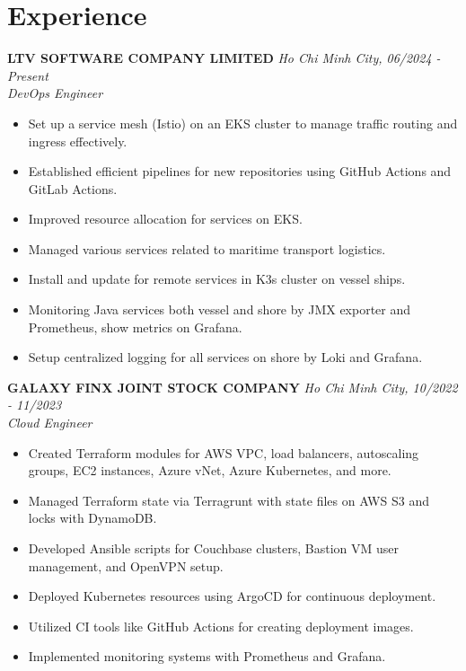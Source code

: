 \documentclass[a4paper,10pt]{article}
\begin{document}
\vspace{10pt}
\section*{Experience}
\noindent \textbf{LTV SOFTWARE COMPANY LIMITED} \hfill \textit{Ho Chi Minh City, 06/2024 - Present}  \\
\textit{DevOps Engineer}
\begin{itemize}[leftmargin=0.5in]
    \item Set up a service mesh (Istio) on an EKS cluster to manage traffic routing and ingress effectively.
    \item Established efficient pipelines for new repositories using GitHub Actions and GitLab Actions.
    \item Improved resource allocation for services on EKS.
    \item Managed various services related to maritime transport logistics.
    \item Install and update for remote services in K3s cluster on vessel ships.
    \item Monitoring Java services both vessel and shore by JMX exporter and Prometheus, show metrics on Grafana.
    \item Setup centralized logging for all services on shore by Loki and Grafana.
\end{itemize}

\vspace{10pt}
\noindent \textbf{GALAXY FINX JOINT STOCK COMPANY} \hfill \textit{Ho Chi Minh City, 10/2022 - 11/2023} \\
\textit{Cloud Engineer}
\begin{itemize}[leftmargin=0.5in]
    \item Created Terraform modules for AWS VPC, load balancers, autoscaling groups, EC2 instances, Azure vNet, Azure Kubernetes, and more.
    \item Managed Terraform state via Terragrunt with state files on AWS S3 and locks with DynamoDB.
    \item Developed Ansible scripts for Couchbase clusters, Bastion VM user management, and OpenVPN setup.
    \item Deployed Kubernetes resources using ArgoCD for continuous deployment.
    \item Utilized CI tools like GitHub Actions for creating deployment images.
    \item Implemented monitoring systems with Prometheus and Grafana.
\end{itemize}
\end{document}
